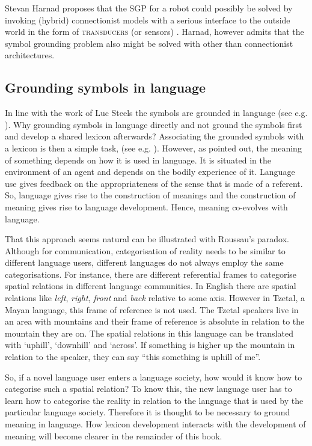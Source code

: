  Stevan Harnad proposes that the SGP for a robot could possibly be solved by invoking (hybrid) connectionist models with a serious interface to the outside world in the form of {\scshape transducers} (or sensors) \citep{harnad:1993}. Harnad, however admits that the symbol grounding problem also might be solved with other than connectionist architectures.

\subsection{Grounding symbols in language}

In line with the work of Luc Steels the symbols are grounded in language (see e.g. \citealt{steels:1997a,steels:2000}). Why grounding symbols in language directly and not ground the symbols first and develop a shared lexicon afterwards? Associating the grounded symbols with a lexicon is then a simple task, (see e.g. \citealt{oliphant:1997,steels:1996a}). However, as \citet{wittgenstein:1958} pointed out, the meaning of something depends on how it is used in language. It is situated in the environment of an agent and depends on the bodily experience of it. Language use gives feedback on the appropriateness of the sense that is made of a referent. So, language gives rise to the construction of meanings and the construction of meaning gives rise to language development. Hence, meaning co-evolves with language.

That this approach seems natural can be illustrated with Roussau's paradox. Although for communication, categorisation of reality needs to be similar to different language users, different languages do not always employ the same categorisations. For instance, there are different referential frames to categorise spatial relations in different language communities. In English there are spatial relations like {\em left}, {\em right}, {\em front} and {\em back} relative to some axis. However in Tzetal, a Mayan language, this frame of reference is not used. The Tzetal speakers live in an area with mountains and their frame of reference is absolute in relation to the mountain they are on. The spatial relations in this language can be translated with `uphill', `downhill' and `across'. If something is higher up the mountain in relation to the speaker, they can say ``this something is uphill of me''.

So, if a novel language user enters a language society, how would it know how to categorise such a spatial relation? To know this, the new language user has to learn how to categorise the reality in relation to the language that is used by the particular language society. Therefore it is thought to be necessary to ground meaning in language. How lexicon development interacts with the development of meaning will become clearer in the remainder of this book.


